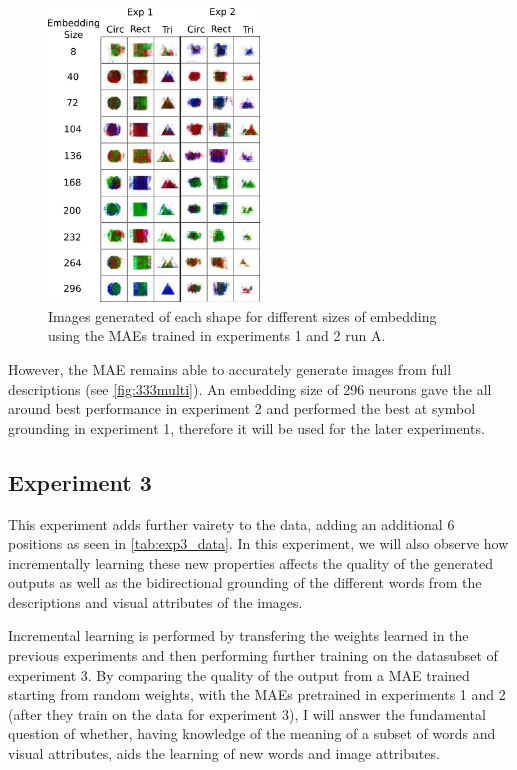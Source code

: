 \begin{figure}[h]
\centering
\includegraphics[width=0.5\textwidth]{Figs/shapes/shapes331v333.png}
\caption{Images generated of each shape for different sizes of embedding using the MAEs trained in experiments 1 and 2 run A.}
\label{fig:shapes333v331}
\end{figure} %
However, the MAE remains able to accurately generate images from full descriptions (see \autoref{fig:333multi}). 
An embedding size of 296 neurons gave the all around best performance in experiment 2 and performed the best at symbol grounding in experiment 1, therefore it will be used for the later experiments.

\newpage
\subsection{Experiment 3}
This experiment adds further vairety to the data, adding an additional 6 positions as seen in \autoref{tab:exp3_data}. In this experiment, we will also observe how incrementally learning these new properties affects the quality of the generated outputs as well as the bidirectional grounding of the different words from the descriptions and visual attributes of the images. 

Incremental learning is performed by transfering the weights learned in the previous experiments and then performing further training on the datasubset of experiment 3. By comparing the quality of the output from a MAE trained starting from random weights, with the MAEs pretrained in experiments 1 and 2 (after they train on the data for experiment 3), I will answer the fundamental question of whether, having knowledge of the meaning of a subset of words and visual attributes, aids the learning of new words and image attributes.

